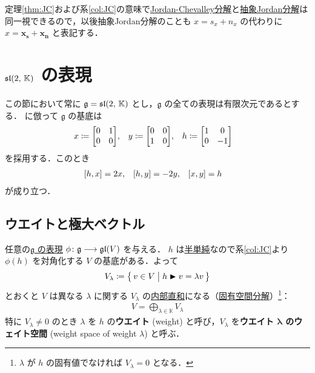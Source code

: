 \documentclass[rep_main]{subfiles}
\begin{document}
\begin{marker}
	定理\ref{thm:JC}および系\ref{col:JC}の意味で\hyperref[prop:Jordan-Chevalley]{Jordan-Chevalley分解}と\hyperref[def:abstruct-JC]{抽象Jordan分解}は同一視できるので，以後抽象Jordan分解のことも $x = s_x + n_x$ の代わりに $x = \bm{x_s} + \bm{x_n}$ と表記する．
\end{marker}


\section{$\mathfrak{sl}(2,\, \mathbb{K})$ の表現}

この節において常に $\mathfrak{g} = \mathfrak{sl}(2,\, \mathbb{K})$ とし，$\mathfrak{g}$ の全ての表現は有限次元であるとする．
に倣って $\mathfrak{g}$ の基底は
\begin{align}
	x &\coloneqq \mqty[0 & 1 \\ 0 & 0], &
	y &\coloneqq \mqty[0 & 0 \\ 1 & 0], &
	h &\coloneqq \mqty[1 & 0 \\ 0 & -1]
\end{align}
を採用する．このとき
\begin{align}
	\label{eq:sl2}
	\comm{h}{x} &= 2x, &
	\comm{h}{y} &= -2y, &
	\comm{x}{y} &= h
\end{align}
が成り立つ．

\subsection{ウエイトと極大ベクトル}

任意の\hyperref[ax:g-module]{$\mathfrak{g}$ の表現} $\phi \colon \mathfrak{g} \longrightarrow \mathfrak{gl}(V)$ を与える．
$h$ は\hyperref[def:semisimple-end]{半単純}なので系\ref{col:JC}より $\phi(h)$ を対角化する $V$ の基底がある．よって
\begin{align}
	\label{def:weight-space}
	V_\lambda \coloneqq \bigl\{\, v \in V \bigm| h \blacktriangleright v = \lambda v \,\bigr\} 
\end{align}
とおくと $V$ は異なる $\lambda$ に関する $V_\lambda$ の\hyperref[prop:subvec-directsum]{内部直和}になる（\hyperref[thm:eigen-decomp1]{固有空間分解}）\footnote{$\lambda$ が $h$ の固有値でなければ $V_\lambda = 0$ となる．}：
\begin{align}
	\label{def:weight-space-decomp}
	V = \bigoplus_{\lambda \in \mathbb{K}} V_\lambda
\end{align}
特に $V_\lambda \neq 0$ のとき $\lambda$ を $h$ の\textbf{ウエイト} (weight) と呼び，$V_\lambda$ を\textbf{ウエイト $\bm{\lambda}$ のウェイト空間} (weight space of weight $\lambda$) と呼ぶ．
\end{document}
